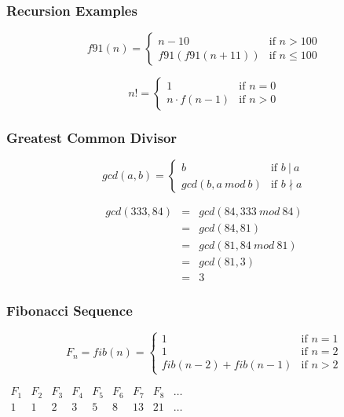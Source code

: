 \documentclass[dvipsnames]{beamer}
\begin{document}
\begin{frame}
  \frametitle{Recursion Examples}

  \[
    f91(n) =
      \begin{cases}
        n - 10         & \mbox{if } n > 100\\
        f91(f91(n+11)) & \mbox{if } n \leq 100
      \end{cases}
  \]

  \pause
  \bigskip
  \[
    n! =
      \begin{cases}
        1              & \mbox{if } n = 0\\
        n \cdot f(n-1) & \mbox{if } n > 0
      \end{cases}
  \]
\end{frame}

\begin{frame}
  \frametitle{Greatest Common Divisor}

  \[
    gcd(a,b) =
      \begin{cases}
        b              & \mbox{if } b~|~a\\
        gcd(b,a~mod~b) & \mbox{if } b \nmid a
      \end{cases}
  \]

  \pause
  \medskip
  \begin{eqnarray*}
    gcd(333,84) & = & gcd(84, 333~mod~84)\\
                & = & gcd(84, 81)\\
                & = & gcd(81, 84~mod~81)\\
                & = & gcd(81, 3)\\
                & = & 3
  \end{eqnarray*}
\end{frame}

\begin{frame}
  \frametitle{Fibonacci Sequence}

  \[
    F_n = fib(n) =
      \begin{cases}
        1                   & \mbox{if } n = 1\\
        1                   & \mbox{if } n = 2\\
        fib(n-2) + fib(n-1) & \mbox{if } n > 2
      \end{cases}
  \]

  \bigskip
  $\begin{array}{ccccccccc}
     F_1 & F_2 & F_3 & F_4 & F_5 & F_6 & F_7 & F_8 & \dots\\
     1   & 1   & 2   & 3   & 5   & 8   & 13  & 21  & \dots
  \end{array}$
\end{frame}
\end{document}
